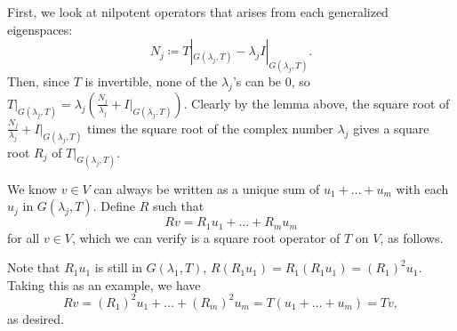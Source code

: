\documentclass{article}
\begin{document}
\begin{itemize}
    First, we look at nilpotent operators that arises from each generalized eigenspaces: \[N_j \coloneqq T|_{G(\lambda_j,T)} - \lambda_j I|_{G(\lambda_j,T)}.\] Then, since $T$ is invertible, none of the $\lambda_j$'s can be 0, so $T|_{G(\lambda_j,T)} = \lambda_j (
    \frac{N_j}{\lambda_j} + I|_{G(\lambda_j,T)})$. Clearly by the lemma above, the square root of $\frac{N_j}{\lambda_j} + I|_{G(\lambda_j,T)}$ times the square root of the complex number $\lambda_j$ gives a square root $R_j$ of $T|_{G(\lambda_j,T)}$.

    We know $v \in V$ can always be written as a unique sum of $u_1 + \dots + u_m$ with each $u_j$ in $G(\lambda_j,T)$. Define $R$ such that \[Rv = R_1u_1 + \dots + R_m u_m\] for all $v \in V$, which we can verify is a square root operator of $T$ on $V$, as follows.

    Note that $R_1u_1$ is still in $G(\lambda_1,T)$, $R(R_1u_1) = R_1(R_1u_1) = (R_1)^2u_1$. Taking this as an example, we have \[Rv = (R_1)^2 u_1 + \dots + (R_m)^2 u_m = T(u_1 + \dots +u_m) = Tv,\] as desired.
\end{itemize}
\end{document}

